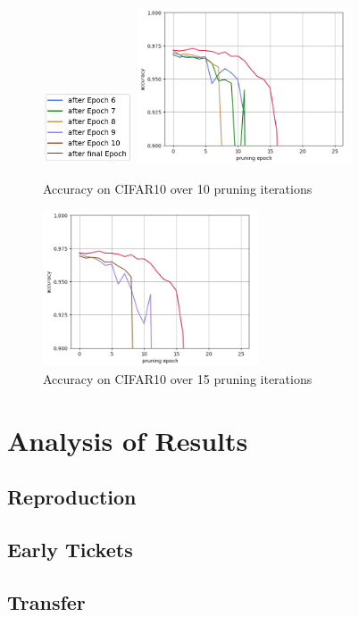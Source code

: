 \begin{figure}
	\begin{minipage}{\textwidth}
		\centering
		\includegraphics[width=100px]{gfx/7-Evaluation/LTH_6_legend.png}
	\end{minipage}
	\begin{minipage}{0.5\textwidth}
		\centering
		\includegraphics[height=175px]{gfx/Experiments/EarlyTicket-MNIST-FCN/678.png}
		\caption*{Accuracy on CIFAR10 over 10 pruning iterations}
		\label{?}
	\end{minipage}\hfill
	\begin{minipage}{0.5\textwidth}
		\centering
		\includegraphics[height=175px]{gfx/Experiments/EarlyTicket-MNIST-FCN/910.png}
		\caption*{Accuracy on CIFAR10 over 15 pruning iterations}
		\label{?}
	\end{minipage}
\end{figure}

\section{Analysis of Results}
\subsection*{Reproduction}
\subsection*{Early Tickets}
\subsection*{Transfer}
